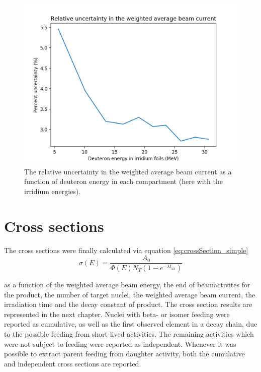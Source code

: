 \begin{figure}
    \centering
    \includegraphics{Analysis/rel_unc_BC.png}
    \caption{The relative uncertainty in the weighted average beam current as a function of deuteron energy in each compartment (here with the irridium energies). }
    \label{fig:rel_unc_BC}
\end{figure}


\section{Cross sections}

The cross sections were finally calculated via equation \ref{eq:crossSection_simple}
\begin{equation}
    \sigma(E)=\frac{A_0}{\Phi(E)N_T(1-e^{-\lambda t_\text{irr}})}
\end{equation}

as a function of the weighted average beam energy,  the end of beamactivites for the product, the number of target nuclei, the weighted average beam current, the irradiation time and the decay constant of product. The cross section results are represented in the next chapter. Nuclei with beta- or isomer feeding were reported as cumulative, as well as the first observed element in a decay chain, due to the possible feeding from short-lived activities. The remaining activities which were not subject to feeding were reported as independent. Whenever it was possible to extract parent feeding from daughter activity, both the cumulative and independent cross sections are reported. \\

